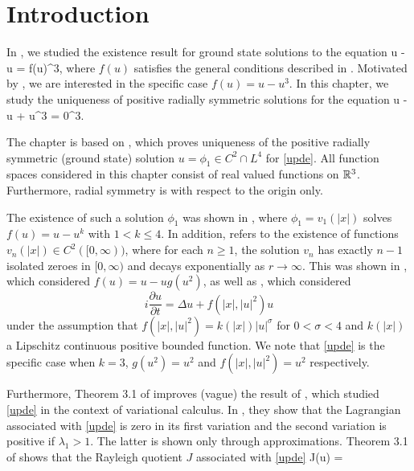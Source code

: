\newcommand{\rd}[1]{{\red ({#1})}}
\section{Introduction}

In , we studied the existence result \cite{ber81} for ground
state solutions to the equation
\be\label{updeber}
\Delta u - u = f(u)\quad{}\R^3,
\ee
where $f(u)$ satisfies the general conditions described in .
Motivated by , we are interested in the specific case 
$f(u) = u - u^3$. In this chapter, we study the uniqueness of positive radially
symmetric solutions for
the equation 
\be\label{upde}
\Delta u - u + u^3 = 0\quad{}\R^3.
\ee

The chapter is based on \cite{coffm}, which  proves uniqueness of the positive
radially symmetric (ground state) solution $u=\phi_1\in C^2\cap L^4$ for
\eqref{upde}. All function spaces considered in this chapter consist of real
valued functions on $\mathbb{R}^3$. Furthermore, radial symmetry is with respect to the
origin only.

The existence of such a solution $\phi_1$ was shown in \cite{nehari},
where $\phi_1=v_1(|x|)$ solves $f(u) = u - u^k$ with $1<k\leq 4$. 
In addition, \cite{coffm} refers to the existence of functions $v_n(|x|)\in
C^2([0, \infty))$, where for each $n\geq 1$, the solution $v_n$ has exactly
$n-1$ isolated zeroes in $[0,\infty)$ and decays exponentially as $r\to\infty$.
This was shown in \cite{ryder}, which considered $f(u) = u - ug(u^2)$,
as well as \cite{berger}, which considered
$$i\frac{\partial u}{\partial t} = \Delta u + f(|x|, |u|^2)u$$ 
under the assumption that $f(|x|, |u|^2)=k(|x|)|u|^\sigma$ for $0<\sigma<4$ and
$k(|x|)$ a Lipschitz continuous positive bounded function. We note that
\eqref{upde} is the specific case when $k=3$, $g(u^2)=u^2$ and
$f(|x|,|u|^2)=u^2$ respectively.

Furthermore, Theorem 3.1 of \cite{coffm} improves \rd{vague} the result of
\cite{robinson}, which studied \eqref{upde} in the context of variational
calculus. In \cite{robinson}, they show that the Lagrangian associated with
\eqref{upde} is zero in its first variation and the second variation is positive
if $\lambda_1 > 1$. The latter is shown only through approximations. Theorem 3.1
of \cite{coffm} shows that the Rayleigh quotient $J$ associated with
\eqref{upde}
\be\label{rayleigh} 
J(u) = 
\ee

